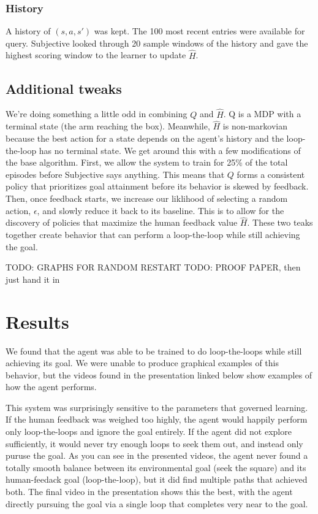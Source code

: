 \documentclass{article}
\begin{document}
\subsubsection{History}

A history of $(s,a,s')$ was kept. The 100 most recent entries were available for query. Subjective looked through 20 sample windows of the history and gave the highest scoring window to the learner to update $\hat{H}$. 

\subsection{Additional tweaks}

We're doing something a little odd in combining $Q$ and $\hat{H}$. Q is a MDP with a terminal state (the arm reaching the box). Meanwhile, $\hat{H}$ is non-markovian because the best action for a state depends on the agent's history and the loop-the-loop has no terminal state. We get around this with a few modifications of the base algorithm. First, we allow the system to train for 25\% of the total episodes before Subjective says anything. This means that $Q$ forms a consistent policy that prioritizes goal attainment before its behavior is skewed by feedback. Then, once feedback starts, we increase our liklihood of selecting a random action, $\epsilon$, and slowly reduce it back to its baseline. This is to allow for the discovery of policies that maximize the human feedback value $\hat{H}$. These two teaks together create behavior that can perform a loop-the-loop while still achieving the goal. 

TODO: GRAPHS FOR RANDOM RESTART
TODO: PROOF PAPER, then just hand it in

\section{Results}

We found that the agent was able to be trained to do loop-the-loops while still achieving its goal. We were unable to produce graphical examples of this behavior, but the videos found in the presentation linked below show examples of how the agent performs. 

This system was surprisingly sensitive to the parameters that governed learning. If the human feedback was weighed too highly, the agent would happily perform only loop-the-loops and ignore the goal entirely. If the agent did not explore sufficiently, it would never try enough loops to seek them out, and instead only puruse the goal. As you can see in the presented videos, the agent never found a totally smooth balance between its environmental goal (seek the square) and its human-feedack goal (loop-the-loop), but it did find multiple paths that achieved both. The final video in the presentation shows this the best, with the agent directly pursuing the goal via a single loop that completes very near to the goal.  
\end{document}
